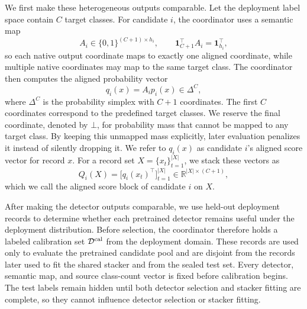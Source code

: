 \documentclass[conference]{IEEEtran}
\theoremstyle{definition}
\begin{document}
We first make these heterogeneous outputs comparable.
Let the deployment label space contain $C$ target classes.
For candidate $i$, the coordinator uses a semantic map
\begin{equation}
A_i\in\{0,1\}^{(C+1)\times h_i},
\qquad
\mathbf 1_{C+1}^\top A_i=\mathbf 1_{h_i}^\top,
\end{equation}
so each native output coordinate maps to exactly one aligned coordinate, while multiple native coordinates may map to the same target class.
The coordinator then computes the aligned probability vector
\begin{equation}
q_i(x)=A_i p_i(x)\in\Delta^{C},
\label{eq:aligned_output}
\end{equation}
where $\Delta^C$ is the probability simplex with $C+1$ coordinates.
The first $C$ coordinates correspond to the predefined target classes.
We reserve the final coordinate, denoted by $\bot$, for probability mass that cannot be mapped to any target class.
By keeping this unmapped mass explicitly, later evaluation penalizes it instead of silently dropping it.
We refer to $q_i(x)$ as candidate $i$'s aligned score vector for record $x$.
For a record set $X=\{x_t\}_{t=1}^{|X|}$, we stack these vectors as
\begin{equation}
Q_i(X)=\big[q_i(x_t)^\top\big]_{t=1}^{|X|}
\in\mathbb R^{|X|\times(C+1)},
\label{eq:aligned_score_block}
\end{equation}
which we call the aligned score block of candidate $i$ on $X$.

After making the detector outputs comparable, we use held-out deployment records to determine whether each pretrained detector remains useful under the deployment distribution.
Before selection, the coordinator therefore holds a labeled calibration set $\mathcal D^{\rm cal}$ from the deployment domain.
These records are used only to evaluate the pretrained candidate pool and are disjoint from the records later used to fit the shared stacker and from the sealed test set.
Every detector, semantic map, and source class-count vector is fixed before calibration begins.
The test labels remain hidden until both detector selection and stacker fitting are complete, so they cannot influence detector selection or stacker fitting.
\end{document}
